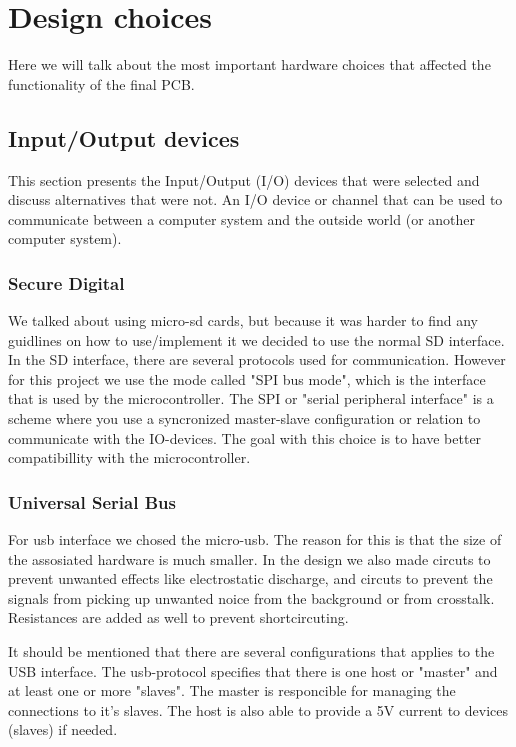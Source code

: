 \section {Design choices}

Here we will talk about the most important hardware choices that affected the functionality of the final PCB.

\subsection{Input/Output devices} \label{pcb:design-choices:ss:IO_devices}
This section presents the Input/Output (I/O) devices that were selected and discuss alternatives that were not.
An I/O device or channel that can be used to communicate between a computer system and the outside world (or another computer system).

\subsubsection{Secure Digital} 
We talked about using micro-sd cards, but because it was harder to find any guidlines on how to use/implement it we decided to use the normal SD interface.
In the SD interface, there are several protocols used for communication. 
However for this project we use the mode called "SPI bus mode", which is the interface that is used by the microcontroller.  
The SPI or "serial peripheral interface" is a scheme where you use a syncronized master-slave configuration or relation to communicate with the IO-devices. 
The goal with this choice is to have better compatibillity with the microcontroller.

\subsubsection{Universal Serial Bus}
For usb interface we chosed the micro-usb. 
The reason for this is that the size of the assosiated hardware is much smaller.
In the design we also made circuts to prevent unwanted effects like electrostatic discharge, and circuts to prevent the signals from picking up unwanted noice from the background or from crosstalk.
Resistances are added as well to prevent shortcircuting.

It should be mentioned that there are several configurations that applies to the USB interface. The usb-protocol
specifies that there is one host or "master" and at least one or more "slaves". The master is responcible for managing the connections
to it's slaves. The host is also able to provide a 5V current to devices (slaves) if needed.

